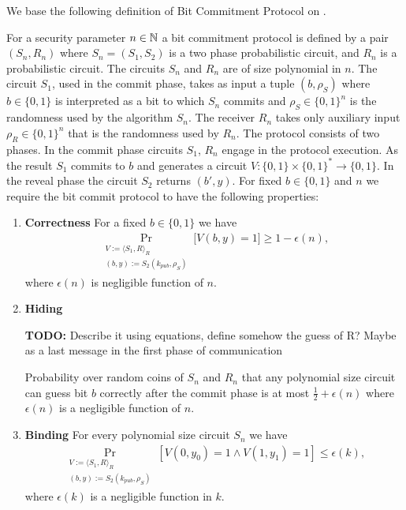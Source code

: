 \documentclass[11pt,a4paper,titlepage]{memoir}
\begin{document}
We base the following definition of Bit Commitment Protocol on \cite{LectureNotesComThCrypto}.
\begin{definition}
  \label{def:bit_commitment}
For a security parameter $n \in \mathbb{N}$ a \textnormal{bit commitment protocol} is defined by a pair $(S_n, R_n)$
where $S_n = (S_1, S_2)$ is a two phase probabilistic circuit, and $R_n$ is a probabilistic circuit.
The circuits $S_n$ and $R_n$ are of size polynomial in $n$.
The circuit $S_1$, used in the commit phase, takes as input a tuple $(b, \rho_S)$ where $b \in \{0,1\}$ is interpreted as a bit to which $S_n$
commits and $\rho_S \in \{0,1\}^{n}$ is the randomness used by the algorithm $S_n$.
The receiver $R_n$ takes only auxiliary input $\rho_R \in \{0,1\}^{n}$ that is the randomness used by $R_n$.
The protocol consists of two phases. In the commit phase circuits $S_1$, $R_n$ engage in the protocol execution.
As the result $S_1$ commits to $b$ and generates a circuit $V: \{0,1\} \times \{0,1\}^{*} \rightarrow \{0,1\}$.
In the reveal phase the circuit $S_2$ returns $(b', y)$. For fixed $b \in \{0,1\}$ and $n$ we require the bit commit protocol to have the following properties:
\begin{enumerate}[]
\item{\textnormal{\textbf{Correctness}}} For a fixed $b \in \{0,1\}$ we have
  \begin{align*}
    \underset{\substack{V := \langle S_1, R \rangle_{R} \\ (b,y) := S_2(k_{pub}, \rho_S) }}{\Pr}\Big[V(b,y) = 1 \Big] \geq 1 - \epsilon(n),
  \end{align*}
where $\epsilon(n)$ is negligible function of $n$.
\item{\textnormal{\textbf{Hiding}}}
  \begin{todo}
    \textbf{TODO:} Describe it using equations, define somehow the guess of R? Maybe as a last message in the first phase of communication
  \end{todo}
  Probability over random coins of $S_n$ and $R_n$ that any polynomial size circuit
  can guess bit $b$ correctly after the commit phase is at most $\frac{1}{2} + \epsilon(n)$ where $\epsilon(n)$ is a negligible function of $n$.
\item{\textnormal{\textbf{Binding}}}
  For every polynomial size circuit $S_n$ we have
  \begin{align*}
    \underset{\substack{V := \langle S_1, R \rangle_{R} \\ (b,y) := S_2(k_{pub}, \rho_S)}}{\Pr}[V(0,y_0) = 1 \land V(1,y_1) = 1] \leq \epsilon(k),
  \end{align*}
  where $\epsilon(k)$ is a negligible function in $k$.
\end{enumerate}
\end{definition}
\end{document}
